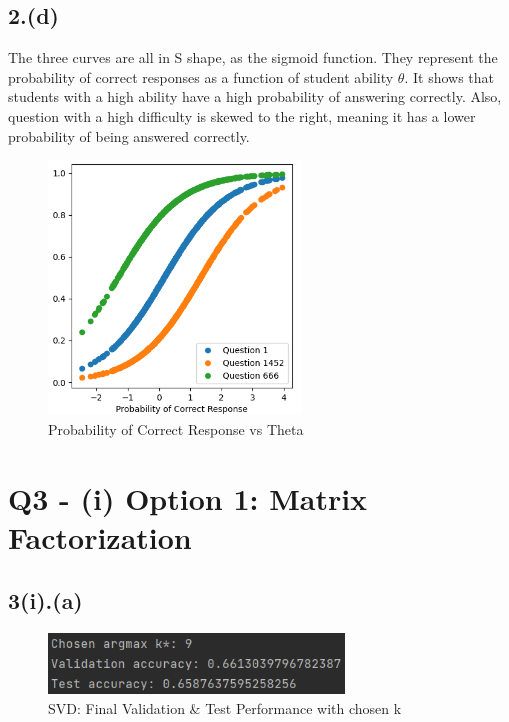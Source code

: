 \documentclass{article}
\begin{document}
\subsection*{2.(d)}
The three curves are all in S shape, as the sigmoid function. They represent the probability of correct responses as a function of student ability $\theta$.\newline
It shows that students with a high ability have a high probability of answering correctly.\newline
Also, question with a high difficulty is skewed to the right, meaning it has a lower probability of being answered correctly.
\begin{figure}[H]
    \centering
    \includegraphics[width=0.6\textwidth]{2(d).png}
    \caption{Probability of Correct Response vs Theta}
\end{figure}


\newpage
\section*{Q3 - (i) Option 1: Matrix Factorization}

\subsection*{3(i).(a)}
\begin{figure}[H]
    \centering
    \includegraphics[width=0.7\textwidth]{3(i)(a).png}
    \caption{SVD: Final Validation \& Test Performance with chosen k\*}
\end{figure}
\end{document}
